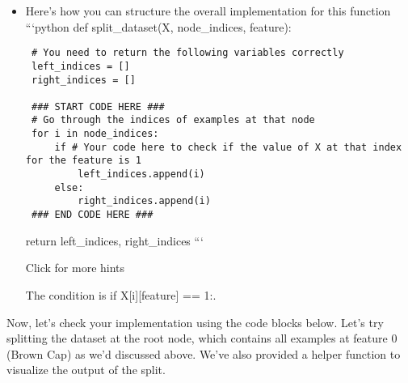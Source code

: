 \documentclass[11pt]{article}
\begin{document}
\begin{itemize}
\item
  Here's how you can structure the overall implementation for this
  function ```python def split\_dataset(X, node\_indices, feature):

\begin{verbatim}
 # You need to return the following variables correctly
 left_indices = []
 right_indices = []

 ### START CODE HERE ###
 # Go through the indices of examples at that node
 for i in node_indices:   
     if # Your code here to check if the value of X at that index for the feature is 1
         left_indices.append(i)
     else:
         right_indices.append(i)
 ### END CODE HERE ###
\end{verbatim}

  return left\_indices, right\_indices ```

  Click for more hints

  The condition is if X{[}i{]}{[}feature{]} == 1:.
\end{itemize}

    Now, let's check your implementation using the code blocks below. Let's
try splitting the dataset at the root node, which contains all examples
at feature 0 (Brown Cap) as we'd discussed above. We've also provided a
helper function to visualize the output of the split.
\end{document}
